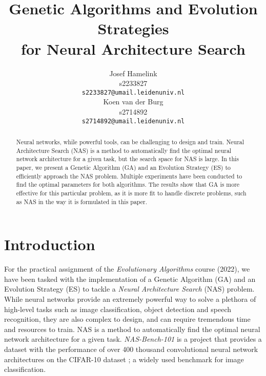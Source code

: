 \documentclass{article}
\title{Genetic Algorithms and Evolution Strategies \\ for Neural Architecture Search}
\author{
    Josef Hamelink \\
    s2233827 \\
    \texttt{s2233827@umail.leidenuniv.nl} \\
    \And
    Koen van der Burg \\
     s2714892 \\
    \texttt{s2714892@umail.leidenuniv.nl} \\
}
\begin{document}
\maketitle



\begin{abstract}
Neural networks, while powerful tools, can be challenging to design and train.
Neural Architecture Search (NAS) is a method to automatically find the optimal neural network architecture for a given task, but the search space for NAS is large.
In this paper, we present a Genetic Algorithm (GA) and an Evolution Strategy (ES) to efficiently approach the NAS problem.
Multiple experiments have been conducted to find the optimal parameters for both algorithms.
The results show that GA is more effective for this particular problem, as it is more fit to handle discrete problems, such as NAS in the way it is formulated in this paper.
\end{abstract}



\section{Introduction}
\label{sec:intro}

For the practical assignment of the \textit{Evolutionary Algorithms} course (2022), we have been tasked with the implementation of a Genetic Algorithm (GA) and an Evolution Strategy (ES) to tackle a \textit{Neural Architecture Search} (NAS) problem.
While neural networks provide an extremely powerful way to solve a plethora of high-level tasks such as image classification, object detection and speech recognition, they are also complex to design, and can require tremendous time and resources to train.
NAS is a method to automatically find the optimal neural network architecture for a given task.
\textit{NAS-Bench-101} \cite{nasbench101} is a project that provides a dataset with the performance of over 400 thousand convolutional neural network architectures on the CIFAR-10 dataset \cite{cifar10}; a widely used benchmark for image classification.
\end{document}
